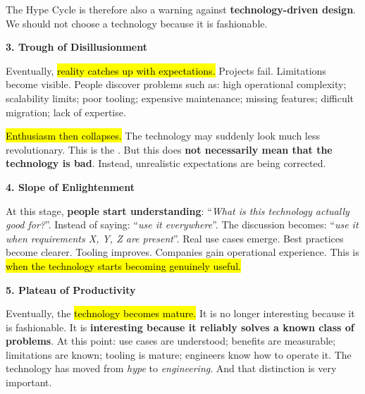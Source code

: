 \highspace
The Hype Cycle is therefore also a warning against \textbf{technology-driven design}. We should not choose a technology because it is fashionable.

\highspace
\begin{flushleft}
    \textcolor{Green3}{ \textbf{3. Trough of Disillusionment}}
\end{flushleft}
Eventually, \hl{reality catches up with expectations.} Projects fail. Limitations become visible. People discover problems such as: high operational complexity; scalability limits; poor tooling; expensive maintenance; missing features; difficult migration; lack of expertise.

\highspace
\hl{Enthusiasm then collapses.} The technology may suddenly look much less revolutionary. This is the . But this does \textbf{not necessarily mean that the technology is bad}. Instead, unrealistic expectations are being corrected.

\highspace
\begin{flushleft}
    \textcolor{Green3}{ \textbf{4. Slope of Enlightenment}}
\end{flushleft}
At this stage, \textbf{people start understanding}: ``\emph{What is this technology actually good for?}''. Instead of saying: ``\emph{use it everywhere}''. The discussion becomes: ``\emph{use it when requirements X, Y, Z are present}''. Real use cases emerge. Best practices become clearer. Tooling improves. Companies gain operational experience. This is \hl{when the technology starts becoming genuinely useful.}

\highspace
\begin{flushleft}
    \textcolor{Green3}{ \textbf{5. Plateau of Productivity}}
\end{flushleft}
Eventually, the \hl{technology becomes mature.} It is no longer interesting because it is fashionable. It is \textbf{interesting because it reliably solves a known class of problems}. At this point: use cases are understood; benefits are measurable; limitations are known; tooling is mature; engineers know how to operate it. The technology has moved from \emph{hype} to \emph{engineering}. And that distinction is very important.

